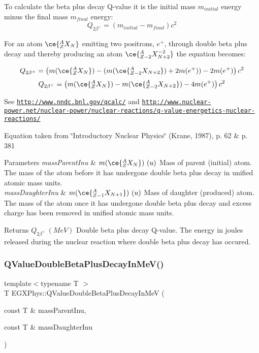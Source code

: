 To calculate the beta plus decay Q-\/value it is the initial mass $m_{initial}$ energy minus the final mass $m_{final}$ energy\+: \[Q_{2\beta^+} = \left ( m_{initial}-m_{final}\right ) c^2\]

For an atom $\ce{ ^{A}_{Z}X_{N} }$ emitting two positrons, $e^+$, through double beta plus decay and thereby producing an atom $\ce{ ^{A}_{Z{-2}}X^{-2}_{N{+2}} }$ the equation becomes\+:

\[Q_{2\beta^+} = \left ( m(\ce{ ^{A}_{Z}X_{N} }) - (m(\ce{ ^{A}_{Z{-2}}X_{N{+2}} }) + 2m(e^+)) - 2m(e^+)\right ) c^2\] \[Q_{2\beta^+} = \left ( m(\ce{ ^{A}_{Z}X_{N} }) - m(\ce{ ^{A}_{Z{-2}}X_{N{+2}} }) - 4m(e^+)\right ) c^2\]

See \href{http://www.nndc.bnl.gov/qcalc/}{\tt http\+://www.\+nndc.\+bnl.\+gov/qcalc/} and \href{http://www.nuclear-power.net/nuclear-power/nuclear-reactions/q-value-energetics-nuclear-reactions/}{\tt http\+://www.\+nuclear-\/power.\+net/nuclear-\/power/nuclear-\/reactions/q-\/value-\/energetics-\/nuclear-\/reactions/}

Equation taken from \char`\"{}\+Introductory Nuclear Physics\char`\"{} (Krane, 1987), p. 62 \& p. 381


\begin{DoxyParams}{Parameters}
{\em mass\+Parent\+Inu} & $m(\ce{ ^{A}_{Z}X_{N} })\ (u)$ Mass of parent (initial) atom. The mass of the atom before it has undergone double beta plus decay in unified atomic mass units. \\
\hline
{\em mass\+Daughter\+Inu} & $m(\ce{ ^{A}_{Z{-1}}X_{N{+1}} })\ (u)$ Mass of daughter (produced) atom. The mass of the atom once it has undergone double beta plus decay and excess charge has been removed in unified atomic mass units. \\
\hline
\end{DoxyParams}
\begin{DoxyReturn}{Returns}
$Q_{2\beta^+}\ (MeV)$ Double beta plus decay Q-\/value. The energy in joules released during the nuclear reaction where double beta plus decay has occured. 
\end{DoxyReturn}
\mbox{\label{group___q_value_ga3fb4b374bc1df69b96a66d0488bb2ba1}} 
\subsubsection{\texorpdfstring{Q\+Value\+Double\+Beta\+Plus\+Decay\+In\+Me\+V()}{QValueDoubleBetaPlusDecayInMeV()}}
{\footnotesize\ttfamily template$<$typename T $>$ \\
T E\+G\+X\+Phys\+::\+Q\+Value\+Double\+Beta\+Plus\+Decay\+In\+MeV (\begin{DoxyParamCaption}\item[{const T \&}]{mass\+Parent\+Inu,  }\item[{const T \&}]{mass\+Daughter\+Inu }\end{DoxyParamCaption})}




